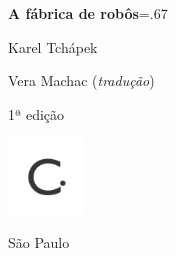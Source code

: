 




\begingroup\thispagestyle{empty}\vspace*{-.01\textheight}\parindent=0pt 
              \formular
              \Huge 
              \textbf{A fábrica de robôs}\baselineskip=.67\baselineskip 

              \vspace{15mm}
              
              \LARGE
              Karel Tchápek
              
              \vspace{5cm}

              \newfontfamily{}
              {\selectfont\minion\small
              Vera Machac (\textit{tradução})}
              
              {\selectfont\minion\footnotesize
              1ª edição}
                    
              \vfill

              \includegraphics[width=2cm]{../logocircuito.png}
              
       

              {\selectfont\minion\small
              São Paulo \quad\the\year}
\endgroup

\pagebreak